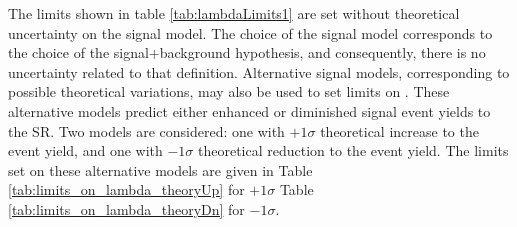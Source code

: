 The limits shown in table \ref{tab:lambdaLimits1} are set without theoretical uncertainty on the signal model.
The choice of the signal model corresponds to the choice of the signal+background hypothesis, and consequently, there is no uncertainty related to that definition.
Alternative signal models, corresponding to possible theoretical variations, may also be used to set limits on \lam.
These alternative models predict either enhanced or diminished signal event yields to the SR.
Two models are considered: one with $+1\sigma$ theoretical increase to the event yield, and one with $-1\sigma$ theoretical reduction to the event yield.
The limits set on these alternative models are given in Table \ref{tab:limits_on_lambda_theoryUp} for $+1\sigma$ Table \ref{tab:limits_on_lambda_theoryDn} for $-1\sigma$.


